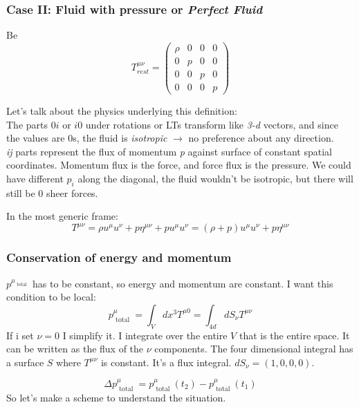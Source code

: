 \subsubsection{Case II: Fluid with pressure or \emph{Perfect Fluid} }

Be
\begin{equation}
T^{\mu \nu }_{rest} = \begin{pmatrix}
\rho  & 0 & 0 & 0 \\
0 & p & 0 & 0 \\
0 & 0 & p & 0 \\
0 & 0 & 0 & p
\end{pmatrix} 
\end{equation}

Let's talk about the physics underlying this definition: \\
The parts $0i$ or $i0$ under rotations or LTs transform like \emph{3-d} vectors, and since the values are 0s, the fluid is \emph{isotropic} $\to $ no preference about any direction.\\
\emph{ij} parts represent the flux of momentum \emph{p} against surface of constant spatial coordinates. Momentum flux is the force, and force flux is the pressure. We could have different $p_{i}$ along the diagonal, the fluid wouldn't be isotropic, but there will still be 0 sheer forces.

In the most generic frame:
\begin{equation}
T^{\mu \nu } = \rho u^{\mu }u^{\nu }+ p \eta^{\mu \nu } + p u^{\mu } u^{\nu } = \left( \rho +p \right) u^{\mu }u^{\nu } + p \eta^{\mu \nu }
\end{equation}

\subsubsection{Conservation of energy and momentum}
$p^{\mu _{ \text{ total }}}$ has to be constant, so energy and momentum are constant.
I want this condition to be local:
\[
p^{\mu }_{ \text{ total } } = \int_{V}^{}{dx^{3}T^{\mu 0}} = \int_{4d}^{}{dS_{\nu }T^{\mu \nu }}
\]
If i set $\nu =0$ I simplify it. I integrate over the entire $V$ that is the entire space. It can be written as the flux of the $\nu $ components. The four dimensional integral has a surface $S$ where $T^{\mu \nu }$ is constant. It's a flux integral. $dS_{\nu } = \left( 1,0,0,0 \right)$.

\[
\Delta p^{\mu }_{ \text{ total }} = p^{\mu }_{ \text{ total }}\left( t_{2} \right) - p^{\mu }_{ \text{ total }}\left( t_{1} \right)
\]
So let's make a scheme to understand the situation.

